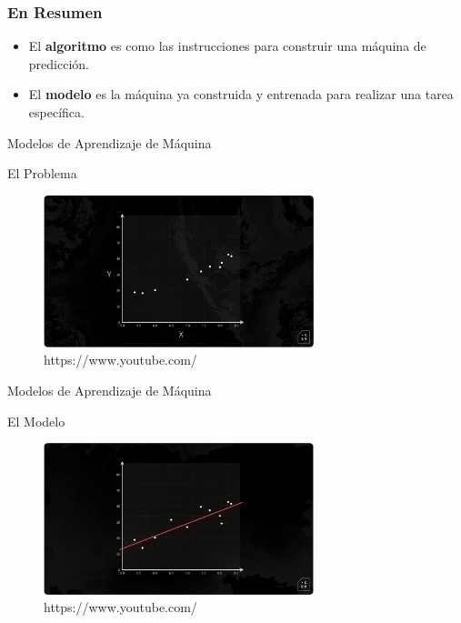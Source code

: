 \documentclass{beamer}
\begin{document}
	
	\begin{frame}
		\frametitle{En Resumen}
		\begin{itemize}
			\item El \textbf{algoritmo} es como las instrucciones para construir una máquina de predicción.
			\item El \textbf{modelo} es la máquina ya construida y entrenada para realizar una tarea específica.
		\end{itemize}
	\end{frame}
	

	

	\begin{frame}{Modelos de Aprendizaje de Máquina}
\begin{block}{El Problema}
	\begin{figure}
		\includegraphics[width=0.7\textwidth]{modelo-algoritmo_1}
		\caption{https://www.youtube.com/}
		\centering
	\end{figure}
\end{block}
		
	\end{frame}
	
		\begin{frame}{Modelos de Aprendizaje de Máquina}
		\begin{block}{El Modelo}
			\begin{figure}
				\includegraphics[width=0.7\textwidth]{modelo-algoritmo_2}
				\caption{https://www.youtube.com/}
				\centering
			\end{figure}
		\end{block}
		
	\end{frame}
	
\end{document}
